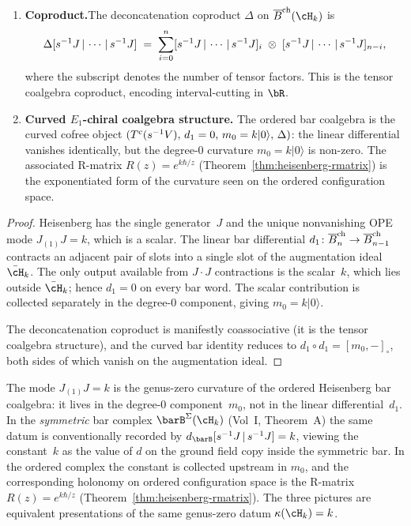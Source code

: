\begin{theorem}
\begin{enumerate}[label=\textup{(\arabic*)}]
\item \textbf{Coproduct.}\enspace The deconcatenation coproduct
$\Delta$ on $\Barch(\cH_k)$ is
\begin{equation}\label{eq:heisenberg-delta-ordered}
\Delta[s^{-1}J \,|\, \cdots \,|\, s^{-1}J]
\;=\;
\sum_{i=0}^{n}
[s^{-1}J \,|\, \cdots \,|\, s^{-1}J]_{i}
\;\otimes\;
[s^{-1}J \,|\, \cdots \,|\, s^{-1}J]_{n-i},
\end{equation}
where the subscript denotes the number of tensor factors.
This is the tensor coalgebra coproduct, encoding interval-cutting
in $\bR$.

\item \textbf{Curved $E_1$-chiral coalgebra structure.}\enspace
The ordered bar coalgebra is the curved cofree object
$(T^c(s^{-1}V),\, d_1=0,\, m_0=k\lvert 0\rangle,\,\Delta)$:
the linear differential vanishes identically, but the
degree-$0$ curvature $m_0=k\lvert 0\rangle$ is non-zero. The
associated R-matrix
$R(z)=e^{k\hbar/z}$
\textup{(}Theorem~\ref{thm:heisenberg-rmatrix}\textup{)} is the
exponentiated form of the curvature seen on the ordered
configuration space.
\end{enumerate}
\end{theorem}

\begin{proof}
Heisenberg has the single generator~$J$ and the unique
nonvanishing OPE mode $J_{(1)}J=k$, which is a scalar. The
linear bar differential
$d_1\colon\overline{B}^{\mathrm{ch}}_n\to\overline{B}^{\mathrm{ch}}_{n-1}$ contracts an adjacent pair
of slots into a single slot of the augmentation ideal
$\bar\cH_k$. The only output available from $J\cdot J$
contractions is the scalar~$k$, which lies outside
$\bar\cH_k$; hence $d_1=0$ on every bar word. The scalar
contribution is collected separately in the degree-$0$
component, giving $m_0=k\lvert 0\rangle$.

The deconcatenation coproduct is manifestly coassociative
(it is the tensor coalgebra structure), and the curved bar
identity reduces to $d_1\circ d_1=[m_0,-]_\circ$, both sides
of which vanish on the augmentation ideal.
\end{proof}

\begin{remark}
\label{rem:heisenberg-j1j}
The mode $J_{(1)}J = k$ is the genus-zero curvature of the
ordered Heisenberg bar coalgebra: it lives in the degree-$0$
component~$m_0$, not in the linear differential~$d_1$. In the
\emph{symmetric} bar complex $\barB^{\Sigma}(\cH_k)$
(Vol~I, Theorem~A) the same datum is conventionally recorded by
$d_{\barB}[\susp^{-1}J \,|\, \susp^{-1}J] = k$, viewing the
constant~$k$ as the value of $d$ on the ground field copy
inside the symmetric bar. In the ordered complex the constant
is collected upstream in $m_0$, and the corresponding holonomy
on ordered configuration space is the R-matrix
$R(z)=e^{k\hbar/z}$
(Theorem~\ref{thm:heisenberg-rmatrix}).
The three pictures are equivalent presentations of the same
genus-zero datum $\kappa(\cH_k)=k$.
\end{remark}

